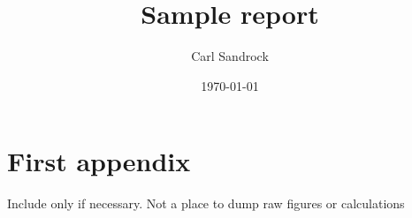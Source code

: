 \documentclass[a4paper,12pt]{article}
\title{Sample report}
\author{Carl Sandrock}
\date{\today}
\begin{document}












\printbibliography

\appendix
\renewcommand{\thefigure}{\thesection.\arabic{figure}}
\renewcommand{\thetable}{\thesection.\arabic{table}}
\renewcommand{\thepage}{\thesection.\arabic{page}}

\section{First appendix}
\setcounter{figure}{0}
\setcounter{table}{0}
\setcounter{page}{1}
Include only if necessary. Not a place to dump raw figures or calculations
\end{document}
